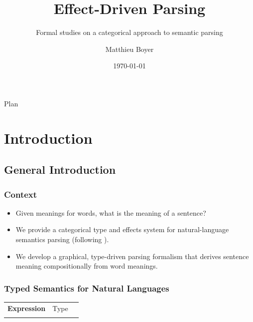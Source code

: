 \documentclass[math, english, info]{beamercours}
\title{Effect-Driven Parsing}
\subtitle{Formal studies on a categorical approach to semantic parsing}
\institute{École Normale Supérieure | Yale University}
\author{Matthieu Boyer}
\date{\today}
\begin{document}
\fancytitleframe

\begin{frame}{Plan}
	\tableofcontents[subsectionstyle=hide,sectionstyle=show]
\end{frame}

\section{Introduction}
\subsection{General Introduction}
\begin{frame}
	\frametitle{Context}
	\begin{itemize}
		\item Given meanings for words, what is the meaning of a sentence?
		      \pause
		\item We provide a categorical type and effects system for
		      natural-language semantics parsing
		      (following \cite{bumfordEffectdrivenInterpretationFunctors2025}).
		\item We develop a graphical, type-driven parsing formalism that
		      derives sentence meaning compositionally from word meanings.
	\end{itemize}
\end{frame}

\begin{frame}[fragile]
	\frametitle{Typed Semantics for Natural Languages}
	\begin{center}
		\setcellgapes{3pt}
		\makegapedcells
		\begin{NiceTabular}{>{\bf}LLL}
			Expression & \rm Type & \lambda{} \\
			\CodeAfter
		\end{NiceTabular}
	\end{center}
\end{frame}
\end{document}
